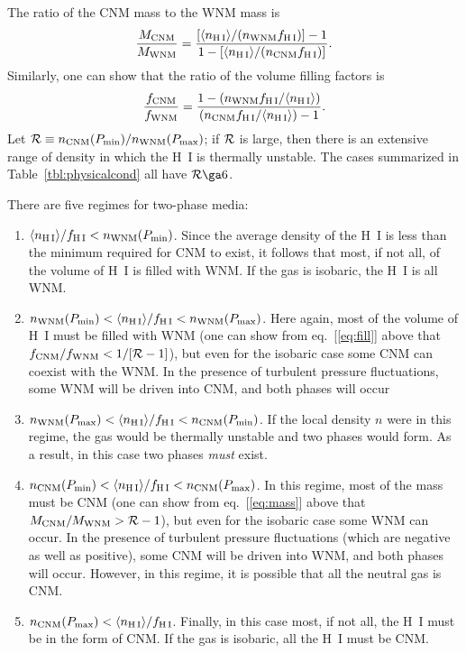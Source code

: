 \documentclass[12pt,preprint,flushrt]{aastex}
\newcommand{\beq}{\begin{equation}}
\newcommand{\eeq}{\end{equation}}
\begin{document}
      The ratio of the CNM mass to the WNM mass is \citep{kro81}
\beq
\frac{M_{\rm CNM}}{M_{\rm WNM}}=
             \frac{[\langle n_{\rm H\, I} \rangle 
               /(n_{\rm WNM}f_{\rm H\,I})]-1}
             {1-[\langle n_{\rm H\, I}\rangle /(n_{\rm CNM}f_{\rm H\,I})]}.
\label{eq:mass}
\eeq
Similarly, one can show that the ratio of the volume filling
factors is
\beq
\frac{f_{\rm CNM}}{f_{\rm WNM}}=\frac{1-(n_{\rm WNM}f_{\rm H\,I}/\langle
  n_{\rm H\, I} \rangle) }{(n_{\rm CNM}f_{\rm H\,I}/\langle n_{\rm H\, I}
       \rangle ) -1}.
\label{eq:fill}
\eeq
Let ${\cal R}\equiv n_{\rm CNM}(P_{\rm min})/n_{\rm WNM}(P_{\rm max})$;
if ${\cal R}$ is large, then there is an extensive range of density
in which the H~I is thermally unstable.  The cases summarized
in Table~\ref{tbl:physicalcond} all have ${\cal R}\ga 6$.


There are five regimes for two-phase media:

\begin{enumerate}
\item $\langle n_{\rm H\, I} \rangle /f_{\rm H\,I}<n_{\rm WNM}(P_{\rm min})$.
Since the  average
density of the H~I is less than the minimum required for CNM to
exist, it follows that most, if not all, of the volume of H~I
is filled with WNM.  If the gas is isobaric, the H~I is all WNM.

\item $n_{\rm WNM}(P_{\rm min})<\langle n_{\rm H\, I} 
\rangle /f_{\rm H\,I}<n_{\rm WNM}(P_{\rm max})$.
Here again, most of the volume of H~I must be filled with WNM
(one can show from eq.~[\ref{eq:fill}] above
that $f_{\rm CNM}/f_{\rm WNM}<1/[{\cal R}-1]$), but even for
the isobaric case some CNM can coexist with the WNM.  In the presence
of turbulent pressure fluctuations, some WNM will be driven
into CNM, and both phases will occur

\item $n_{\rm WNM}(P_{\rm max})<\langle n_{\rm H\, I}\rangle /f_{\rm H\,I}
<n_{\rm CNM}(P_{\rm min})$.
If the local density $n$ were in this regime, the gas would
be thermally unstable and two phases would form.  As a result,
in this case two phases {\it must} exist.

\item $n_{\rm CNM}(P_{\rm min})<\langle n_{\rm H\, I}\rangle /f_{\rm H\,I}
<n_{\rm CNM}(P_{\rm max})$.
In this regime, most of the mass must be CNM
(one can show from eq.~[\ref{eq:mass}] above
that $M_{\rm CNM}/M_{\rm WNM}>{\cal R}-1$), but even for the
isobaric case some WNM can occur.  In the presence of turbulent
pressure fluctuations (which are negative as
well as positive), some CNM will be driven into WNM, and both
phases will occur. However, in this regime, it is possible that 
all the neutral gas is CNM. 

\item $n_{\rm CNM}(P_{\rm max})<\langle n_{\rm H\, I}\rangle /f_{\rm H\,I}$.
Finally, in this case most, if not all, the H~I must be
in the form of CNM.  If the gas is isobaric, all the H~I must be CNM.

\end{enumerate}
\end{document}
